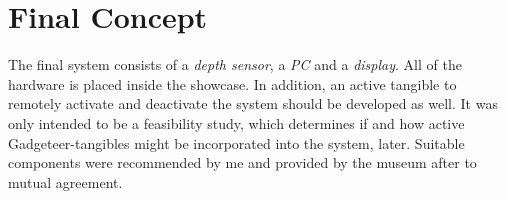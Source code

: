 %


\section{Final Concept}
\label{conception_final}


The final system consists of a \textit{depth sensor}, a \textit{PC} and a \textit{display}. All of the hardware is placed inside the showcase. In addition, an active tangible to remotely activate and deactivate the system should be developed as well. It was only intended to be a feasibility study, which determines if and how active Gadgeteer-tangibles might be incorporated into the system, later. Suitable components were recommended by me and provided by the museum after to mutual agreement.

